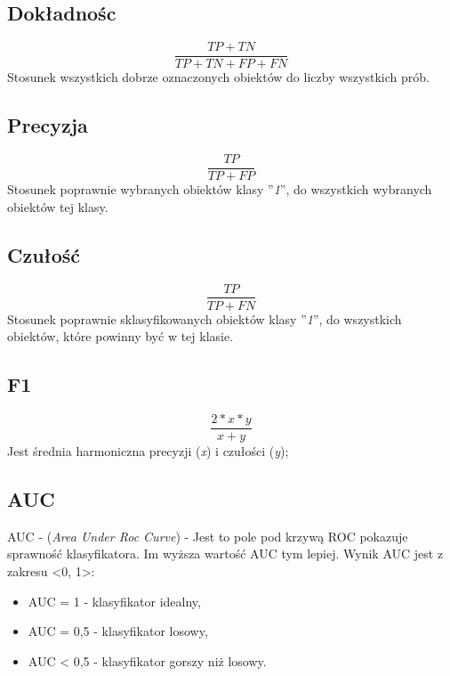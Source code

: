 \subsection{Dokładnośc}
\begin{equation}\label{math:acc}
    \frac{TP + TN}{TP + TN + FP + FN}
\end{equation}
Stosunek wszystkich dobrze oznaczonych obiektów do liczby wszystkich prób.

\subsection{Precyzja}
\begin{equation}\label{math:prec}
    \frac{TP}{TP + FP}
\end{equation}
Stosunek poprawnie wybranych obiektów klasy ''\textit{1}'', do wszystkich wybranych obiektów tej klasy.

\subsection{Czułość}
\begin{equation}\label{math:rec}
    \frac{TP}{TP + FN}
\end{equation}
Stosunek poprawnie sklasyfikowanych obiektów klasy ''\textit{1}'', do wszystkich obiektów, które powinny być w tej klasie.

\subsection{F1}
\begin{equation}\label{math:f1}
   \frac{2*x*y}{x + y}
\end{equation}
Jest średnia harmoniczna precyzji (\textit{x}) i czułości (\textit{y});


\subsection{AUC}
AUC - (\textit{Area Under Roc Curve}) - Jest to pole pod krzywą ROC pokazuje sprawność klasyfikatora. Im wyższa wartość AUC tym lepiej. Wynik AUC jest z zakresu <0, 1>:
\begin{itemize}
    \item AUC = 1 - klasyfikator idealny,
    \item AUC = 0,5 - klasyfikator losowy,
    \item AUC < 0,5 - klasyfikator gorszy niż losowy\cite{Algolytics}.
\end{itemize}